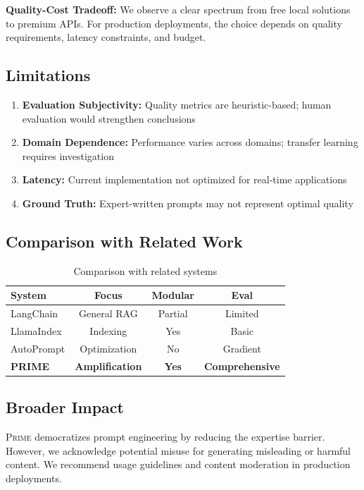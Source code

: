 \documentclass[11pt,a4paper]{article}
\newcommand{\primesys}{\textsc{Prime}}
\begin{document}
\textbf{Quality-Cost Tradeoff:} We observe a clear spectrum from free local solutions to premium APIs. For production deployments, the choice depends on quality requirements, latency constraints, and budget.

\subsection{Limitations}

\begin{enumerate}
    \item \textbf{Evaluation Subjectivity:} Quality metrics are heuristic-based; human evaluation would strengthen conclusions
    \item \textbf{Domain Dependence:} Performance varies across domains; transfer learning requires investigation
    \item \textbf{Latency:} Current implementation not optimized for real-time applications
    \item \textbf{Ground Truth:} Expert-written prompts may not represent optimal quality
\end{enumerate}

\subsection{Comparison with Related Work}

\begin{table}[h]
\centering
\small
\begin{tabular}{lccc}
\toprule
\textbf{System} & \textbf{Focus} & \textbf{Modular} & \textbf{Eval} \\
\midrule
LangChain & General RAG & Partial & Limited \\
LlamaIndex & Indexing & Yes & Basic \\
AutoPrompt & Optimization & No & Gradient \\
\textbf{PRIME} & \textbf{Amplification} & \textbf{Yes} & \textbf{Comprehensive} \\
\bottomrule
\end{tabular}
\caption{Comparison with related systems}
\label{tab:comparison}
\end{table}

\subsection{Broader Impact}

\primesys{} democratizes prompt engineering by reducing the expertise barrier. However, we acknowledge potential misuse for generating misleading or harmful content. We recommend usage guidelines and content moderation in production deployments.
\end{document}
